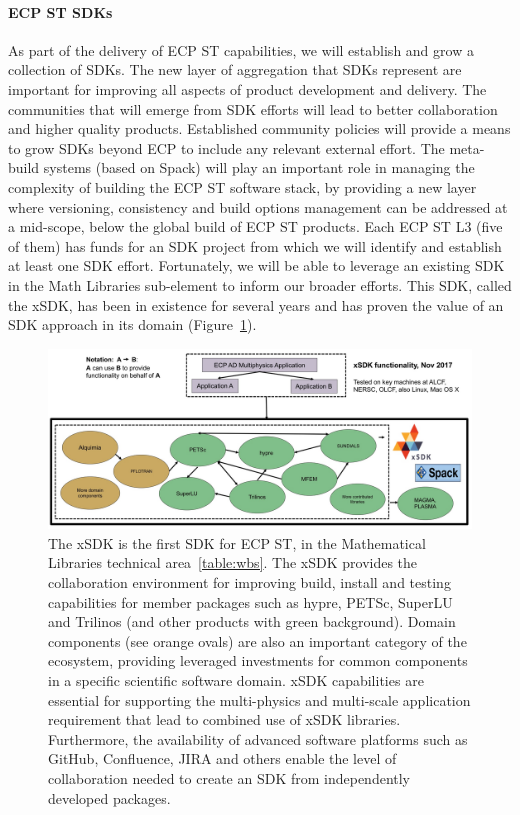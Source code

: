 \paragraph{ECP ST SDKs}
As part of the delivery of ECP ST capabilities, we will establish and grow a collection of SDKs. The new layer of aggregation that SDKs represent are important for improving all aspects of product development and delivery. The communities that will emerge from SDK efforts will lead to better collaboration and higher quality products. Established community policies will provide a means to grow SDKs beyond ECP to include any relevant external effort. The meta-build systems (based on Spack) will play an important role in managing the complexity of building the ECP ST software stack, by providing a new layer where versioning, consistency and build options management can be addressed at a mid-scope, below the global build of ECP ST products.
Each ECP ST L3 (five of them) has funds for an SDK project from which we will identify and establish at least one SDK effort. Fortunately, we will be able to leverage an existing SDK in the Math Libraries sub-element to inform our broader efforts. This SDK, called the xSDK, has been in existence for several years and has proven the value of an SDK approach in its domain (Figure~\ref{fig:xsdk-diagram}). 

\begin{figure}
	\centering
	\includegraphics[width=0.9\linewidth]{xSDK-Diagram}
	\caption{The xSDK is the first SDK for ECP ST, in the Mathematical Libraries technical area~\ref{table:wbs}. The xSDK provides the collaboration environment for improving build, install and testing capabilities for member packages such as hypre, PETSc, SuperLU and Trilinos (and other products with green background). Domain components (see orange ovals) are also an important category of the ecosystem, providing leveraged investments for common components in a specific scientific software domain.  xSDK capabilities are essential for supporting the multi-physics and multi-scale application requirement that lead to combined use of xSDK libraries. Furthermore, the availability of advanced software platforms such as GitHub, Confluence, JIRA and others enable the level of collaboration needed to create an SDK from independently developed packages.}
	\label{fig:xsdk-diagram}
\end{figure}


